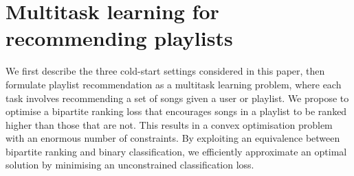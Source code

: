 \section{Multitask learning for recommending playlists}
\label{sec:method}




We first describe the three cold-start settings considered in this paper,
then formulate
playlist recommendation as a multitask learning problem, 
where each task involves recommending a set of songs given a user or playlist.
We propose to optimise a bipartite ranking loss that encourages songs in a playlist
to be ranked higher than those that are not.
%
This results in a convex %
optimisation problem with an enormous number of constraints.
By exploiting an equivalence between bipartite ranking and binary classification,
we efficiently approximate an optimal solution by minimising an unconstrained classification loss.

